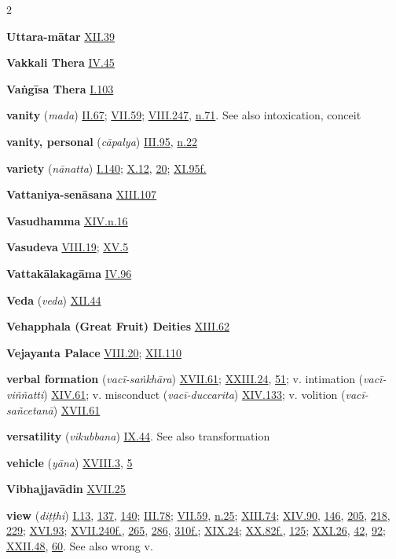 \begin{multicols}{2}
\begin{vismHanging}
\par\textbf{Uttara-mātar} \hyperlink{XII.39}{XII.39}{}
\par\textbf{Vakkali Thera} \hyperlink{IV.45}{IV.45}{}
\par\textbf{Vaṅgīsa Thera} \hyperlink{I.103}{I.103}{}
\par\textbf{vanity} (\emph{mada}) \hyperlink{II.67}{II.67}{}; \hyperlink{VII.59}{VII.59}{}; \hyperlink{VIII.247}{VIII.247}{}, \hyperlink{VIII.n71}{n.71}{}. See also intoxication, conceit 
\par\textbf{vanity, personal} (\emph{cāpalya}) \hyperlink{III.95}{III.95}{}, \hyperlink{III.n22}{n.22}{}
\par\textbf{variety} (\emph{nānatta}) \hyperlink{I.140}{I.140}{}; \hyperlink{X.12}{X.12}{}, \hyperlink{X.20}{20}{}; \hyperlink{XI.95}{XI.95f.}{}
\par\textbf{Vattaniya-senāsana} \hyperlink{XIII.107}{XIII.107}{}
\par\textbf{Vasudhamma} \hyperlink{XIV.n16}{XIV.n.16}{}
\par\textbf{Vasudeva} \hyperlink{VIII.19}{VIII.19}{}; \hyperlink{XV.5}{XV.5}{}
\par\textbf{Vattakālakagāma} \hyperlink{IV.96}{IV.96}{}
\par\textbf{Veda} (\emph{veda}) \hyperlink{XII.44}{XII.44}{}
\par\textbf{Vehapphala (Great Fruit) Deities} \hyperlink{XIII.62}{XIII.62}{}
\par\textbf{Vejayanta Palace} \hyperlink{VIII.20}{VIII.20}{}; \hyperlink{XII.110}{XII.110}{}
\par\textbf{verbal formation} (\emph{vacī-saṅkhāra}) \hyperlink{XVII.61}{XVII.61}{}; \hyperlink{XXIII.24}{XXIII.24}{}, \hyperlink{XXIII.51}{51}{}; v. intimation (\emph{vacī-viññatti}) \hyperlink{XIV.61}{XIV.61}{}; v. misconduct (\emph{vacī-duccarita}) \hyperlink{XIV.133}{XIV.133}{}; v. volition (\emph{vacī-sañcetanā}) \hyperlink{XVII.61}{XVII.61}{}
\par\textbf{versatility} (\emph{vikubbana}) \hyperlink{IX.44}{IX.44}{}. See also transformation 
\par\textbf{vehicle} (\emph{yāna}) \hyperlink{XVIII.3}{XVIII.3}{}, \hyperlink{XVIII.5}{5}{}
\par\textbf{Vibhajjavādin} \hyperlink{XVII.25}{XVII.25}{}
\par\textbf{view} (\emph{diṭṭhi}) \hyperlink{I.13}{I.13}{}, \hyperlink{I.137}{137}{}, \hyperlink{I.140}{140}{}; \hyperlink{III.78}{III.78}{}; \hyperlink{VII.59}{VII.59}{}, \hyperlink{VII.n25}{n.25}{}; \hyperlink{XIII.74}{XIII.74}{}; \hyperlink{XIV.90}{XIV.90}{}, \hyperlink{XIV.146}{146}{}, \hyperlink{XIV.205}{205}{}, \hyperlink{XIV.218}{218}{}, \hyperlink{XIV.229}{229}{}; \hyperlink{XVI.93}{XVI.93}{}; \hyperlink{XVII.240}{XVII.240f.}{}, \hyperlink{XVII.265}{265}{}, \hyperlink{XVII.286}{286}{}, \hyperlink{XVII.310}{310f.}{}; \hyperlink{XIX.24}{XIX.24}{}; \hyperlink{XX.82}{XX.82f.}{}, \hyperlink{XX.125}{125}{}; \hyperlink{XXI.26}{XXI.26}{}, \hyperlink{XXI.42}{42}{}, \hyperlink{XXI.92}{92}{}; \hyperlink{XXII.48}{XXII.48}{}, \hyperlink{XXII.60}{60}{}. See also wrong v. 

\end{vismHanging}
\end{multicols}
